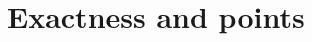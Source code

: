 \documentclass[../../../main]{subfiles}
\begin{document}
\section{Exactness and points}
\end{document}
